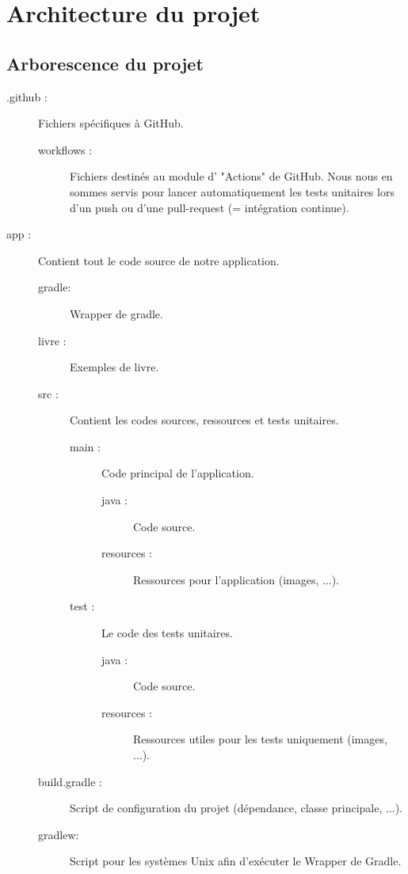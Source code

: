 \chapter{Architecture du projet}

	\section{Arborescence du projet}
		\label{sec:arborescenceProjet}
		\begin{description}
			\item[.github :]{Fichiers spécifiques à GitHub.}
			\begin{description}
				\item[workflows :]{Fichiers destinés au module d' "Actions" de GitHub. Nous nous en sommes servis pour lancer automatiquement les tests unitaires lors d'un push ou d'une pull-request (= intégration continue).}
			\end{description}
			\item[app :]{Contient tout le code source de notre application.}
			\begin{description}
				\item[gradle:]{Wrapper de gradle.}
				\item[livre :]{Exemples de livre.}
				\item[src :]{Contient les codes sources, ressources et tests unitaires.}
				\begin{description}
					\item[main :]{Code principal de l'application.}
					\begin{description}
						\item[java :]{Code source.}
						\item[resources :]{Ressources pour l'application (images, ...).}
					\end{description}
					\item[test :]{Le code des tests unitaires.}
					\begin{description}
						\item[java :]{Code source.}
						\item[resources :]{Ressources utiles pour les tests uniquement (images, ...).}
					\end{description}
				\end{description}
				\item[build.gradle :]{Script de configuration du projet (dépendance, classe principale, ...).}
				\item[gradlew:]{Script pour les systèmes Unix afin d'exécuter le Wrapper de Gradle.}

\end{description}
\end{description}

